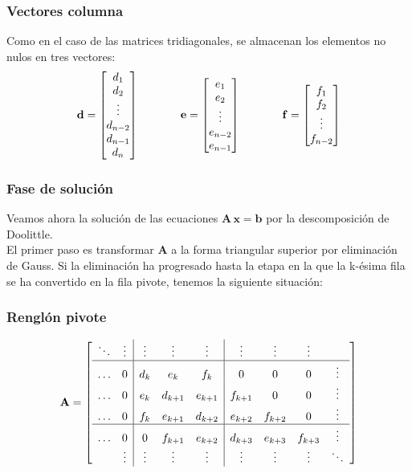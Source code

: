 \documentclass[12pt]{beamer}
\begin{document}
\begin{frame}
\frametitle{Vectores columna}
Como en el caso de las matrices tridiagonales, se almacenan los elementos no nulos en tres vectores:
\pause
\renewcommand{\arraystretch}{0.9}
\begin{align*}
\mathbf{d} = \begin{bmatrix}
d_{1} \\
d_{2} \\
\vdots \\
d_{n-2} \\
d_{n-1} \\
d_{n}
\end{bmatrix}
\hspace{1.3cm}
\mathbf{e} =
\begin{bmatrix}
e_{1} \\
e_{2} \\
\vdots \\
e_{n-2} \\
e_{n-1}
\end{bmatrix}
\hspace{1.3cm}
\mathbf{f} =
\begin{bmatrix}
f_{1} \\
f_{2} \\
\vdots \\
f_{n-2}
\end{bmatrix}
\end{align*}
\end{frame}
\begin{frame}
\frametitle{Fase de solución}
Veamos ahora la solución de las ecuaciones $\mathbf{A \, x} = \mathbf{b}$ por la descomposición de Doolittle.
\\
\bigskip
\pause
El primer paso es transformar $\mathbf{A}$ a la forma triangular superior por eliminación de Gauss. \pause Si la eliminación ha progresado hasta la etapa en la que la k-ésima fila se ha convertido en la fila pivote, tenemos la siguiente situación:
\end{frame}
\begin{frame}
\frametitle{Renglón pivote}
\renewcommand{\arraystretch}{0.9}
\begin{align*}
\mathbf{A} =
\left[
\begin{array}{c c | c c c | c c c c}
\ddots & \vdots & \vdots & \vdots & \vdots & \vdots & \vdots & \vdots & \\ \hline
\ldots & 0 & d_{k} & e_{k} & f_{k} & 0 & 0 & 0 & \vdots \\
\ldots & 0 & e_{k} & d_{k+1} & e_{k+1} & f_{k+1} & 0 & 0 & \vdots \\
\ldots & 0 & f_{k} & e_{k+1} & d_{k+2} & e_{k+2} & f_{k+2} & 0 & \vdots \\ \hline
\ldots & 0 & 0 & f_{k+1} & e_{k+2} & d_{k+3} & e_{k+3} & f_{k+3} & \vdots \\
 & \vdots & \vdots & \vdots & \vdots & \vdots & \vdots & \vdots & \ddots
\end{array}
\right]
\end{align*}
\end{frame}
\end{document}
